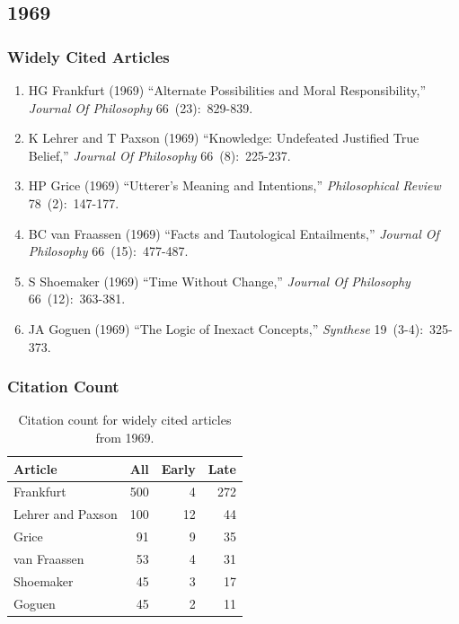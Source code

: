 \documentclass[
  10pt,
  letterpaper,
  DIV=11,
  numbers=noendperiod,
  twoside]{scrartcl}
\providecommand{\tightlist}{%
  \setlength{\itemsep}{0pt}\setlength{\parskip}{0pt}}\usepackage{longtable,booktabs,array}
\begin{document}
\newpage

\subsection{1969}\label{sec-s1969}

\subsubsection*{Widely Cited Articles}\label{widely-cited-articles-12}

\begin{enumerate}
\def\labelenumi{\arabic{enumi}.}
\tightlist
\item
  HG Frankfurt (1969) ``Alternate Possibilities and Moral
  Responsibility,'' \emph{Journal Of Philosophy} 66~(23):~829-839.
\item
  K Lehrer and T Paxson (1969) ``Knowledge: Undefeated Justified True
  Belief,'' \emph{Journal Of Philosophy} 66~(8):~225-237.
\item
  HP Grice (1969) ``Utterer's Meaning and Intentions,''
  \emph{Philosophical Review} 78~(2):~147-177.
\item
  BC van Fraassen (1969) ``Facts and Tautological Entailments,''
  \emph{Journal Of Philosophy} 66~(15):~477-487.
\item
  S Shoemaker (1969) ``Time Without Change,'' \emph{Journal Of
  Philosophy} 66~(12):~363-381.
\item
  JA Goguen (1969) ``The Logic of Inexact Concepts,'' \emph{Synthese}
  19~(3-4):~325-373.
\end{enumerate}

\subsubsection*{Citation Count}\label{sec-count-1969}

\begin{longtable}[]{@{}lrrr@{}}

\caption{\label{tbl-citation-count-1969}Citation count for widely cited
articles from 1969.}

\tabularnewline

\toprule\noalign{}
Article & All & Early & Late \\
\midrule\noalign{}
\endhead
\bottomrule\noalign{}
\endlastfoot
Frankfurt & 500 & 4 & 272 \\
Lehrer and Paxson & 100 & 12 & 44 \\
Grice & 91 & 9 & 35 \\
van Fraassen & 53 & 4 & 31 \\
Shoemaker & 45 & 3 & 17 \\
Goguen & 45 & 2 & 11 \\

\end{longtable}
\end{document}
